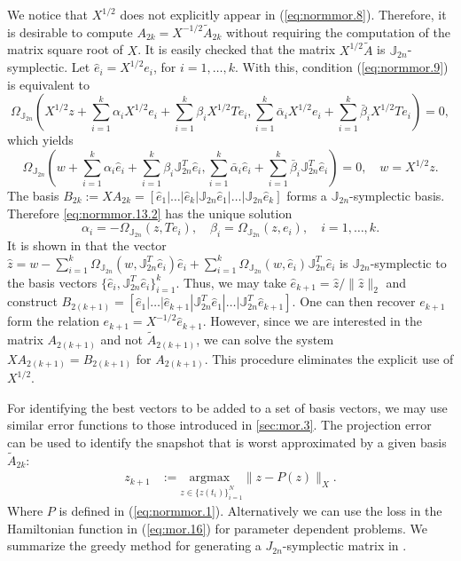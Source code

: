We notice that $X^{1/2}$ does not explicitly appear in (\ref{eq:normmor.8}). Therefore, it is desirable to compute $A_{2k} = X^{-1/2} \tilde A_{2k}$ without requiring the computation of the matrix square root of $X$. It is easily checked that the matrix $X^{1/2} \tilde A$ is $\mathbb J_{2n}$-symplectic. Let $\hat e_i = X^{1/2} e_i$, for $i=1,\dots,k$. With this, condition (\ref{eq:normmor.9}) is equivalent to
\begin{equation} \label{eq:normmor.13.1}
	\Omega_{\mathbb J_{2n}}\left( X^{1/2}z +\sum_{i=1}^{k} \alpha_i X^{1/2} e_i +\sum_{i=1}^{k} \beta_i X^{1/2} Te_i, \sum_{i=1}^{k}\bar \alpha_i X^{1/2} e_i +\sum_{i=1}^{k} \bar \beta_i X^{1/2} Te_i \right) = 0,
\end{equation}
which yields
\begin{equation} \label{eq:normmor.13.2}
	\Omega_{\mathbb J_{2n}}\left( w +\sum_{i=1}^{k} \alpha_i \hat e_i +\sum_{i=1}^{k} \beta_i \mathbb J_{2n}^T \hat e_i, \sum_{i=1}^{k}\bar \alpha_i \hat e_i +\sum_{i=1}^{k} \bar \beta_i \mathbb J_{2n}^T \hat e_i \right) = 0, \quad w = X^{1/2} z.
\end{equation}
The basis $B_{2k}:=XA_{2k} = [\hat e_1|\dots|\hat e_k|\mathbb J_{2n} \hat e_1|\dots | \mathbb J_{2n} \hat e_k]$ forms a $\mathbb J_{2n}$-symplectic basis. Therefore \cref{eq:normmor.13.2} has the unique solution
\begin{equation}
	\alpha_i = - \Omega_{\mathbb J_{2n}}(z,Te_i), \quad \beta_i = \Omega_{\mathbb J_{2n}}(z,e_i), \quad i=1,\dots,k.
\end{equation}
It is shown in \cite{doi:10.1137/17M1111991} that the vector $\hat z = w -\sum_{i=1}^{k} \Omega_{\mathbb J_{2n}}(w,\mathbb J_{2n}^T \hat e_i) \hat e_i +\sum_{i=1}^{k} \Omega_{\mathbb J_{2n}}(w,\hat e_i) \mathbb J_{2n}^T \hat e_i$ is $\mathbb J_{2n}$-symplectic to the basis vectors $\{ \hat e_i, \mathbb J_{2n}^T \hat e_i \}_{i=1}^{k}$. Thus, we may take $\hat e_{k+1} = \hat z / \| \hat z \|_2$ and construct $B_{2(k+1)} = [ \hat e_1|\dots|\hat e_{k+1} | \mathbb J_{2n}^T \hat e_1 |\dots | \mathbb J_{2n}^T \hat e_{k+1} ]$. One can then recover $e_{k+1}$ form the relation $e_{k+1} = X^{-1/2} \hat e_{k+1}$. However, since we are interested in the matrix $A_{2(k+1)}$ and not $\tilde A_{2(k+1)}$, we can solve the system $XA_{2(k+1)} = B_{2(k+1)}$ for $A_{2(k+1)}$. This procedure eliminates the explicit use of $X^{1/2}$.

For identifying the best vectors to be added to a set of basis vectors, we may use similar error functions to those introduced in \cref{sec:mor.3}. The projection error can be used to identify the snapshot that is worst approximated by a given basis $\tilde A_{2k}$:
\begin{equation} \label{eq:normmor.14}
\begin{aligned}
	z_{k+1} &:= \underset{z\in\{ z(t_i)\}_{i=1}^{N}}{\text{argmax } }\| z - P(z) \|_X.
\end{aligned}
\end{equation}
Where $P$ is defined in (\ref{eq:normmor.1}). Alternatively we can use the loss in the Hamiltonian function in (\ref{eq:mor.16}) for parameter dependent problems. We summarize the greedy method for generating a $J_{2n}$-symplectic matrix in .

